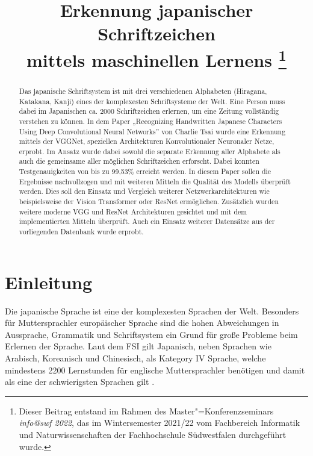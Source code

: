 \documentclass[twoside,a4paper]{IEEEtran}
\begin{document}
\title{Erkennung japanischer Schriftzeichen \\mittels maschinellen Lernens%
    \thanks{%
    Dieser Beitrag entstand im 
    Rahmen des Master"=Konferenzseminars \emph{info@swf 2022}, das im
    Wintersemester 2021/22 vom Fachbereich Informatik und
    Naturwissenschaften der Fachhochschule Südwestfalen
    durchgeführt wurde.}}
\author{
}

\maketitle


\begin{abstract}
Das japanische Schriftsystem ist mit drei verschiedenen Alphabeten (Hiragana, Katakana, Kanji) eines der komplexesten Schriftsysteme der Welt. Eine Person muss dabei im Japanischen ca. 2000 Schriftzeichen erlernen, um eine Zeitung vollständig verstehen zu können. In dem Paper „Recognizing Handwritten Japanese Characters Using Deep Convolutional Neural Networks” von Charlie Tsai wurde eine Erkennung mittels der VGGNet, speziellen Architekturen Konvolutionaler Neuronaler Netze, erprobt. Im Ansatz wurde dabei sowohl die separate Erkennung aller Alphabete als auch die gemeinsame aller möglichen Schriftzeichen erforscht. Dabei konnten Testgenauigkeiten von bis zu 99,53\% erreicht werden. In diesem Paper sollen die Ergebnisse nachvollzogen und mit weiteren Mitteln die Qualität des Modells überprüft werden. Dies soll den Einsatz und Vergleich weiterer Netzwerkarchitekturen wie beispielsweise der Vision Transformer oder ResNet ermöglichen. Zusätzlich wurden weitere moderne VGG und ResNet Architekturen gesichtet und mit dem implementierten Mitteln überprüft. Auch ein Einsatz weiterer Datensätze aus der vorliegenden Datenbank wurde erprobt. 
\end{abstract}


\section{Einleitung}
Die japanische Sprache ist eine der komplexesten Sprachen der Welt. Besonders für Muttersprachler europäischer Sprache sind die hohen Abweichungen in Aussprache, Grammatik und Schriftsystem ein Grund für große Probleme beim Erlernen der Sprache. Laut dem FSI gilt Japanisch, neben Sprachen wie Arabisch, Koreanisch und Chinesisch, als Kategory IV Sprache, welche mindestens 2200 Lernstunden für englische Muttersprachler benötigen und damit als eine der schwierigsten Sprachen gilt \cite{FSI}.
\end{document}
